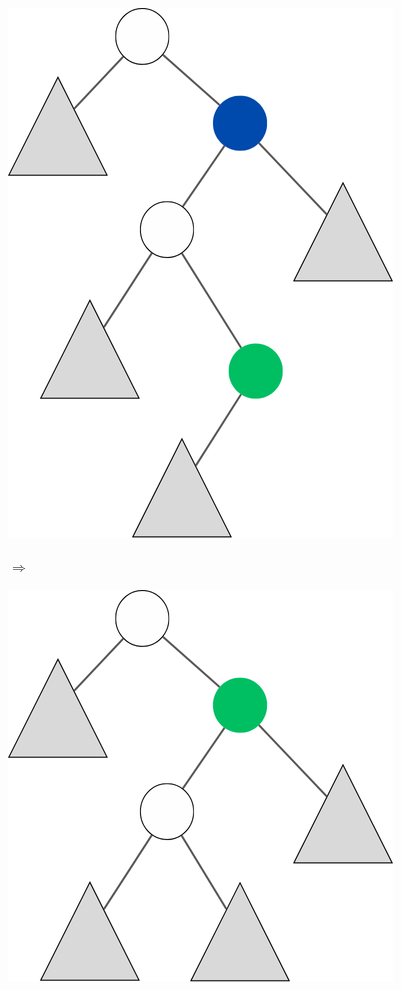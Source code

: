 \begin{figure}[!ht]
	\centering
	\begin{minipage}{0.4\textwidth}
		\centering
		\includegraphics[scale=0.5]{figures/rubro-negra/removal-example.png}
		\caption{}
	\end{minipage}%
	\hspace{1em}
	\textbf{$\Longrightarrow$}
	\hspace{1em}
	\begin{minipage}{0.4\textwidth}
		\centering
		\includegraphics[scale=0.5]{figures/rubro-negra/removal-example-solution.png}
		\caption{}
	\end{minipage}
\end{figure}
\FloatBarrier

